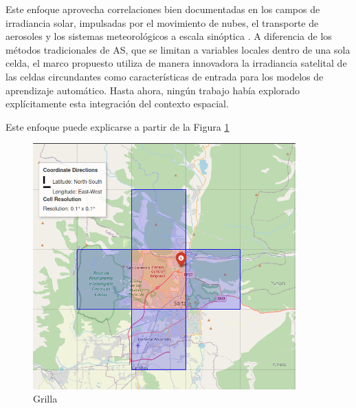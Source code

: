 Este enfoque aprovecha correlaciones bien documentadas en los campos de irradiancia solar, impulsadas por el movimiento de nubes, el transporte de aerosoles y los sistemas meteorológicos a escala sinóptica \citep{IHSAN2024}. A diferencia de los métodos tradicionales de AS, que se limitan a variables locales dentro de una sola celda, el marco propuesto utiliza de manera innovadora la irradiancia satelital de las celdas circundantes como características de entrada para los modelos de aprendizaje automático. Hasta ahora, ningún trabajo había explorado explícitamente esta integración del contexto espacial.



Este enfoque puede explicarse a partir de la Figura \ref{fig:gridSA}



\begin{figure}
    \centering
    \includegraphics[width=0.9\textwidth]{figuras/gridSA.png}
    \caption{Grilla }
    \label{fig:gridSA}
\end{figure}



